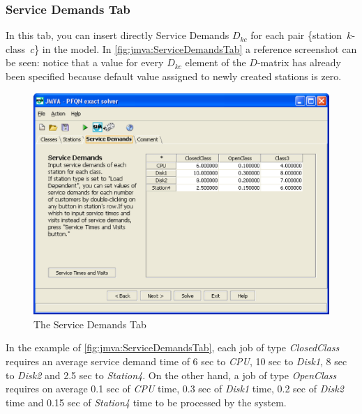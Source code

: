 \subsubsection{Service Demands Tab}
In this tab, you can insert directly Service Demands $D_{kc}$ for
each pair \{station~$k$-class~$c$\} in the model. In
\autoref{fig:jmva:ServiceDemandsTab} a reference screenshot can be
seen: notice that a value for every $D_{kc}$ element of the
$D$-matrix has already been specified because default value assigned
to newly created stations is zero.

\begin{figure}[htbp]
    \begin{center}
        \includegraphics[scale=.5]{img/jmva/serviceDemands}
    \end{center}
    \caption{The Service Demands Tab}
    \label{fig:jmva:ServiceDemandsTab}
\end{figure}

In the example of \autoref{fig:jmva:ServiceDemandsTab}, each job of
type \emph{ClosedClass} requires an average service demand time of 6
sec to \emph{CPU}, 10 sec to \emph{Disk1}, 8 sec to
\emph{Disk2} and 2.5 sec to \emph{Station4}. On the other hand, a job of type \emph{OpenClass} requires on
average 0.1 sec of \emph{CPU} time, 0.3 sec of \emph{Disk1} time,
0.2 sec of \emph{Disk2} time and 0.15 sec of \emph{Station4} time to
be processed by the system.

